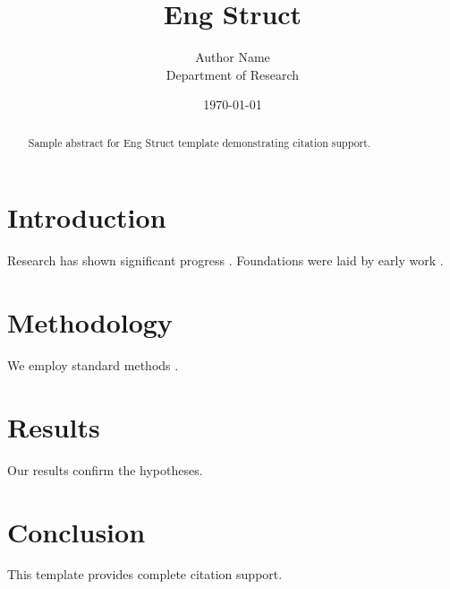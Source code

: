 ﻿\documentclass{elsarticle}
\title{Eng Struct}
\author{Author Name \\ \small Department of Research}
\date{\today}
\begin{document}
\maketitle

\begin{abstract}
Sample abstract for Eng Struct template demonstrating citation support.
\end{abstract}

\section{Introduction}
Research has shown significant progress \citep{einstein1905}. Foundations were laid by early work \citep{turing1950}.

\section{Methodology}
We employ standard methods \citep{knuth1984}.

\section{Results}
Our results confirm the hypotheses.

\section{Conclusion}
This template provides complete citation support.



\end{document}
